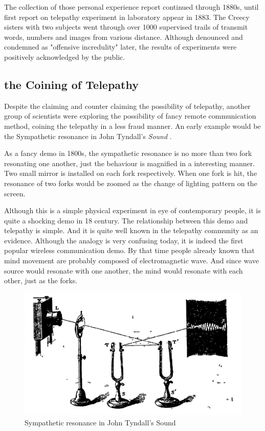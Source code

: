\documentclass[a4paper]{article}
\begin{document}
The collection of those personal experience report continued through 1880s, until first report on telepathy experiment in laboratory appear in 1883. The Creecy sisters with two subjects went through over 1000 supervised trails \autocite{luckhurst2002invention} of transmit words, numbers and images from various distance. Although denounced and condemned as "offensive incredulity" later, the results of experiments were positively acknowledged by the public.

\subsection{the Coining of Telepathy}

Despite the claiming and counter claiming the possibility of telepathy, another group of scientists were exploring the possibility of fancy remote communication method, coining the telepathy in a less fraud manner. An early example would be the Sympathetic resonance in John Tyndall's \textit{Sound} \autocite{tyndall1897sound}.

As a fancy demo in 1800s, the sympathetic resonance is no more than two fork resonating one another, just the behaviour is magnified in a interesting manner.
Two small mirror is installed on each fork respectively. When one fork is hit, the resonance of two forks would be zoomed as the change of lighting pattern on the screen. 

Although this is a simple physical experiment in eye of contemporary people, it is quite a shocking demo in 18 century. The relationship between this demo and telepathy is simple. And it is quite well known in the telepathy community as an evidence. Although the analogy is very confusing today, it is indeed the first popular wireless communication demo. By that time people already known that mind movement are probably composed of electromagnetic wave. And since wave source would resonate with one another, the mind would resonate with each other, just as the forks.

\begin{figure}
	\centering
	\includegraphics[width= \linewidth]{Sound1}
	\caption{Sympathetic resonance in John Tyndall's Sound}
	\label{fig:Sound1}
\end{figure}
\end{document}
